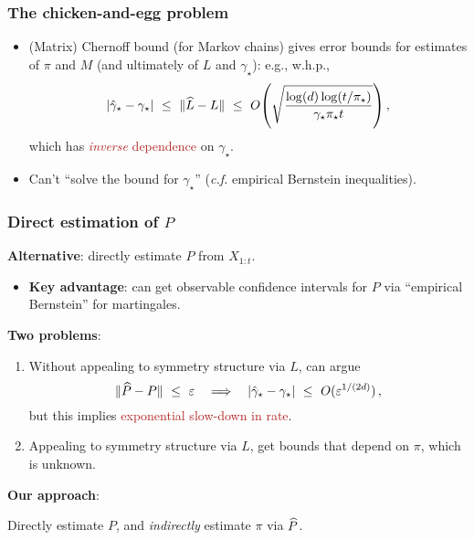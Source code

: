 \documentclass[11pt,compress,blue4]{beamer}
\newcommand{\FIREBRICK}[1]{\textcolor{firebrick}{#1}}
\newcommand\fns\footnotesize
\newcommand\pimin{\ensuremath{\pi_{\star}}}
\newcommand\gap{\ensuremath{\gamma_{\star}}}
\newcommand\gaphat{\ensuremath{\hat{\gamma}_{\star}}}
\begin{document}

\begin{frame}
  \frametitle{The chicken-and-egg problem}

  \begin{itemize}
    \item
      (Matrix) Chernoff bound {\fns(for Markov chains)} gives error
      bounds for estimates of $\pi$ and $M$ (and ultimately of $L$ and
      $\gap$): e.g., w.h.p.,
      \[
        \abs{\gaphat-\gap}
        \ \leq \
        \norm{\wh L - L}
        \ \leq \
        O\Parens{
          \sqrt{\frac{\log(d)\log(t/\pimin)}{\gap\pimin t}}
        }
        \,,
      \]
      which has \FIREBRICK{\emph{inverse} dependence} on $\gap$.

      \medskip

    \item
      Can't ``solve the bound for $\gap$''
      {\fns(\emph{c.f.} empirical Bernstein inequalities)}.

  \end{itemize}

\end{frame}


\begin{frame}
  \frametitle{Direct estimation of $P$}

  \textbf{Alternative}: directly estimate $P$ from $X_{1:t}$.

  \begin{itemize}
    \item
      \textbf{Key advantage}: can get observable confidence intervals
      for $P$ via ``empirical Bernstein'' for martingales.

  \end{itemize}

  \textbf{Two problems}:
  \begin{enumerate}
    \item
      Without appealing to symmetry structure via $L$, can argue
      \[
        \norm{\wh{P} - P} \ \leq \ \veps
        \quad\Longrightarrow\quad
        \abs{\gaphat - \gap} \ \leq \ O(\veps^{1/(2d)})
        \,,
      \]
      but this implies \FIREBRICK{exponential slow-down in rate}.

      \medskip

    \item
      Appealing to symmetry structure via $L$, get bounds that depend
      on $\pi$, which is unknown.

  \end{enumerate}

  \begin{center}
    \textbf{Our approach}:

    Directly estimate $P$, and \emph{indirectly} estimate $\pi$ via
    $\widehat P$.
  \end{center}

\end{frame}
\end{document}
